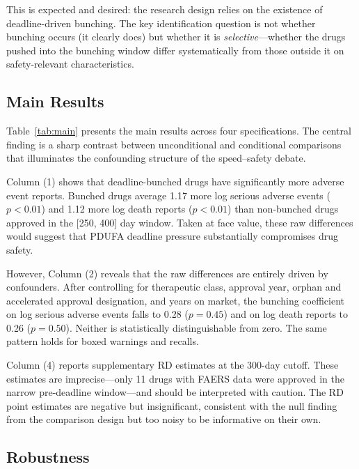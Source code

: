 \documentclass[12pt]{article}
\begin{document}
This is expected and desired: the research design relies on the existence of deadline-driven bunching. The key identification question is not whether bunching occurs (it clearly does) but whether it is \textit{selective}---whether the drugs pushed into the bunching window differ systematically from those outside it on safety-relevant characteristics.

\subsection{Main Results}



Table~\ref{tab:main} presents the main results across four specifications. The central finding is a sharp contrast between unconditional and conditional comparisons that illuminates the confounding structure of the speed--safety debate.

Column (1) shows that deadline-bunched drugs have significantly more adverse event reports. Bunched drugs average 1.17 more log serious adverse events ($p < 0.01$) and 1.12 more log death reports ($p < 0.01$) than non-bunched drugs approved in the [250, 400] day window. Taken at face value, these raw differences would suggest that PDUFA deadline pressure substantially compromises drug safety.

However, Column (2) reveals that the raw differences are entirely driven by confounders. After controlling for therapeutic class, approval year, orphan and accelerated approval designation, and years on market, the bunching coefficient on log serious adverse events falls to 0.28 ($p = 0.45$) and on log death reports to 0.26 ($p = 0.50$). Neither is statistically distinguishable from zero. The same pattern holds for boxed warnings and recalls.

Column (4) reports supplementary RD estimates at the 300-day cutoff. These estimates are imprecise---only 11 drugs with FAERS data were approved in the narrow pre-deadline window---and should be interpreted with caution. The RD point estimates are negative but insignificant, consistent with the null finding from the comparison design but too noisy to be informative on their own.

\subsection{Robustness}


\end{document}
